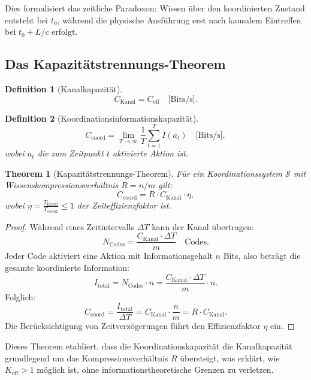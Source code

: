 \documentclass[11pt,a4paper]{article}
\newtheorem{theorem}{Theorem}
\newtheorem{definition}{Definition}
\begin{document}
	Dies formalisiert das zeitliche Paradoxon: Wissen über den koordinierten Zustand entsteht bei $t_0$, während die physische Ausführung erst nach kausalem Eintreffen bei $t_0 + L/c$ erfolgt.
	
	\subsection{Das Kapazitätstrennungs-Theorem}
	
	\begin{definition}[Kanalkapazität]
		\[
		C_{\text{Kanal}} = C_{\text{eff}} \quad \text{[Bits/s]}.
		\]
	\end{definition}
	
	\begin{definition}[Koordinationsinformationskapazität]
		\[
		C_{\text{coord}} = \lim_{T \to \infty} \frac{1}{T} \sum_{t=1}^{T} I(a_t) \quad \text{[Bits/s]},
		\]
		wobei $a_t$ die zum Zeitpunkt $t$ aktivierte Aktion ist.
	\end{definition}
	
	\begin{theorem}[Kapazitätstrennungs-Theorem]
		\label{thm:capacity-separation}
		Für ein Koordinationssystem $\mathcal{S}$ mit Wissenskompressionsverhältnis $R = n/m$ gilt:
		\[
		C_{\text{coord}} = R \cdot C_{\text{Kanal}} \cdot \eta,
		\]
		wobei $\eta = \frac{T_{\text{Kanal}}}{T_{\text{coord}}} \leq 1$ der Zeiteffizienzfaktor ist.
	\end{theorem}
	
	\begin{proof}
		Während eines Zeitintervalls $\Delta T$ kann der Kanal übertragen:
		\[
		N_{\text{Codes}} = \frac{C_{\text{Kanal}} \cdot \Delta T}{m} \quad \text{Codes}.
		\]
		Jeder Code aktiviert eine Aktion mit Informationsgehalt $n$ Bits, also beträgt die gesamte koordinierte Information:
		\[
		I_{\text{total}} = N_{\text{Codes}} \cdot n = \frac{C_{\text{Kanal}} \cdot \Delta T}{m} \cdot n.
		\]
		Folglich:
		\[
		C_{\text{coord}} = \frac{I_{\text{total}}}{\Delta T} = C_{\text{Kanal}} \cdot \frac{n}{m} = R \cdot C_{\text{Kanal}}.
		\]
		Die Berücksichtigung von Zeitverzögerungen führt den Effizienzfaktor $\eta$ ein.
	\end{proof}
	
	Dieses Theorem etabliert, dass die Koordinationskapazität die Kanalkapazität grundlegend um das Kompressionsverhältnis $R$ übersteigt, was erklärt, wie $K_{\mathrm{eff}} > 1$ möglich ist, ohne informationstheoretische Grenzen zu verletzen.
	
\end{document}
